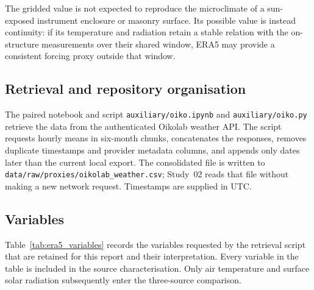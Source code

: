 \documentclass[11pt,a4paper]{article}
\begin{document}
The gridded value is not expected to reproduce the microclimate of a
sun-exposed instrument enclosure or masonry surface. Its possible value is
instead continuity: if its temperature and radiation retain a stable relation
with the on-structure measurements over their shared window, ERA5 may provide a
consistent forcing proxy outside that window.

\subsection{Retrieval and repository organisation}

The paired notebook and script \texttt{auxiliary/oiko.ipynb} and
\texttt{auxiliary/oiko.py} retrieve the data from the authenticated Oikolab
weather API. The script requests hourly means in six-month chunks, concatenates
the responses, removes duplicate timestamps and provider metadata columns, and
appends only dates later than the current local export. The consolidated file is
written to \texttt{data/raw/proxies/oikolab\_weather.csv}; Study~02 reads that
file without making a new network request. Timestamps are supplied in UTC.

\subsection{Variables}

Table~\ref{tab:era5_variables} records the variables requested by the retrieval
script that are retained for this report and their interpretation. Every
variable in the table is included in the source characterisation. Only air
temperature and surface solar radiation subsequently enter the three-source
comparison.
\end{document}
